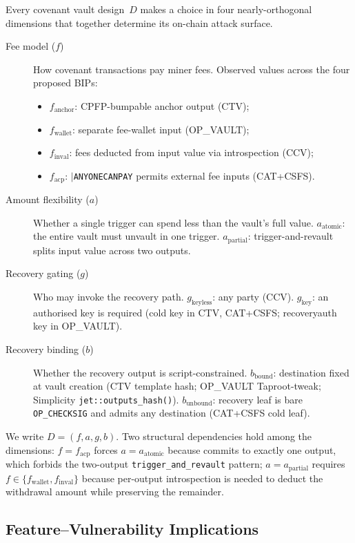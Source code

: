 Every covenant vault design~$D$ makes a choice in four nearly-orthogonal
dimensions that together determine its on-chain attack surface.

\begin{description}
  \item[Fee model ($f$)] How covenant transactions pay miner fees. Observed
    values across the four proposed BIPs:
    \begin{itemize}
      \item $f_{\text{anchor}}$: CPFP-bumpable anchor output (CTV);
      \item $f_{\text{wallet}}$: separate fee-wallet input (OP\_VAULT);
      \item $f_{\text{inval}}$: fees deducted from input value via
        introspection (CCV);
      \item $f_{\text{acp}}$: $|$\texttt{ANYONECANPAY}
        permits external fee inputs (CAT+CSFS).
    \end{itemize}
  \item[Amount flexibility ($a$)] Whether a single trigger can spend less
    than the vault's full value. $a_{\text{atomic}}$: the entire vault
    must unvault in one trigger. $a_{\text{partial}}$: trigger-and-revault
    splits input value across two outputs.
  \item[Recovery gating ($g$)] Who may invoke the recovery path.
    $g_{\text{keyless}}$: any party (CCV). $g_{\text{key}}$: an authorised
    key is required (cold key in CTV, CAT+CSFS; recoveryauth key in
    OP\_VAULT).
  \item[Recovery binding ($b$)] Whether the recovery output is
    script-constrained. $b_{\text{bound}}$: destination fixed at vault
    creation (CTV template hash; OP\_VAULT Taproot-tweak; Simplicity
    \texttt{jet::outputs\_hash()}). $b_{\text{unbound}}$: recovery leaf
    is bare \texttt{OP\_CHECKSIG} and admits any destination (CAT+CSFS
    cold leaf).
\end{description}

We write $D = (f, a, g, b)$. Two structural dependencies hold among the
dimensions: $f = f_{\text{acp}}$ forces $a = a_{\text{atomic}}$ because
 commits to exactly one output, which forbids the
two-output \texttt{trigger\_and\_revault} pattern;
$a = a_{\text{partial}}$ requires $f \in \{f_{\text{wallet}},
f_{\text{inval}}\}$ because per-output introspection is needed to deduct
the withdrawal amount while preserving the remainder.

\subsection{Feature--Vulnerability Implications}
\label{ss:feature_vuln}

